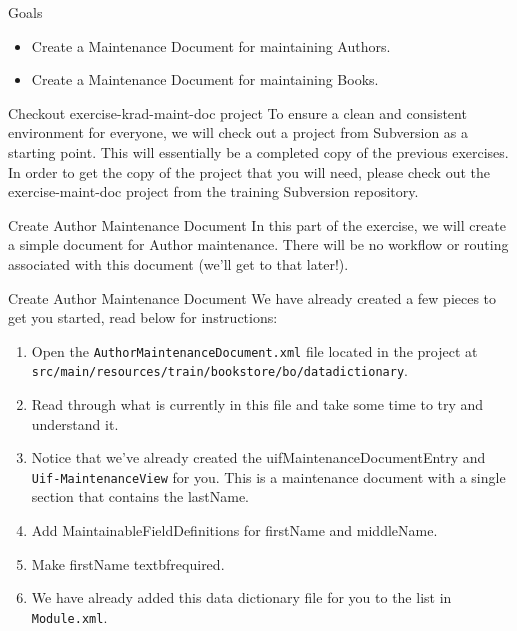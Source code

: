 \documentclass[xcolor=dvipsnames,14pt,professionalfonts]{beamer}
\begin{document}
\begin{frame}{Goals}
  \begin{itemize}
    \item Create a Maintenance Document for maintaining Authors.
    \item Create a Maintenance Document for maintaining Books.
  \end{itemize}
\end{frame}
\begin{frame}{Checkout exercise-krad-maint-doc project}
  To ensure a clean and consistent environment for everyone, we will check out a project from Subversion as a starting point.  This will essentially be a completed copy of the previous exercises.
In order to get the copy of the project that you will need, please
check out the exercise-maint-doc project from the training Subversion
repository.
\end{frame}
\begin{frame}{Create Author Maintenance Document}
  In this part of the exercise, we will create a simple document
    for Author maintenance.  There will be no workflow or routing
    associated with this document (we’ll get to that later!).
\end{frame}

\begin{frame}{Create Author Maintenance Document}
  We have already created a few pieces to get you started, read below for instructions:
  \begin{enumerate}
  \item Open the \texttt{AuthorMaintenanceDocument.xml} file located in the project at \texttt{src/main/resources/train/bookstore/bo/datadictionary}.
  \item Read through what is currently in this file and take some time to try and understand it.
  \item Notice that we’ve already created the
    uifMaintenanceDocumentEntry and \texttt{Uif-MaintenanceView} for you.  This is a maintenance document with a single section that contains the lastName.
  \item Add MaintainableFieldDefinitions for firstName and middleName.
  \item Make firstName 
textbf{required}.
  \item We have already added this data dictionary file for you to the list in \texttt{Module.xml}.
  \end{enumerate}
\end{frame}
\end{document}
